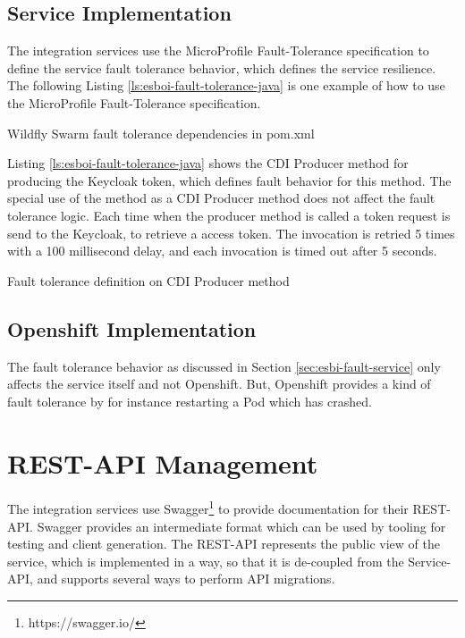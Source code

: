 \subsection{Service Implementation}
\label{sec:esbi-fault-service}
The integration services use the MicroProfile Fault-Tolerance specification to define the service fault tolerance behavior, which defines the service resilience. The following Listing \vref{ls:esboi-fault-tolerance-java} is one example of how to use the MicroProfile Fault-Tolerance specification.

\begin{listing}
	\caption{Wildfly Swarm fault tolerance dependencies in pom.xml}
	\label{ls:esboi-fault-tolerance-pom}
\end{listing}

Listing \vref{ls:esboi-fault-tolerance-java} shows the CDI Producer method for producing the Keycloak token, which defines fault behavior for this method. The special use of the method as a CDI Producer method does not affect the fault tolerance logic. Each time when the producer method is called a token request is send to the Keycloak, to retrieve a access token. The invocation is retried 5 times with a 100 millisecond delay, and each invocation is timed out after 5 seconds.

\begin{listing}
	\caption{Fault tolerance definition on CDI Producer method}
	\label{ls:esboi-fault-tolerance-java}
\end{listing} 

\subsection{Openshift Implementation}
\label{sec:esbi-fault-openshift}
The fault tolerance behavior as discussed in Section \vref{sec:esbi-fault-service} only affects the service itself and not Openshift. But, Openshift provides a kind of fault tolerance by for instance restarting a Pod which has crashed.

\section{REST-API Management}
\label{sec:esbi-api}
The integration services use Swagger\footnote{https://swagger.io/} to provide documentation for their REST-API. Swagger provides an intermediate format which can be used by tooling for testing and client generation. The REST-API represents the public view of the service, which is implemented in a way, so that it is de-coupled from the Service-API, and supports several ways to perform API migrations.

